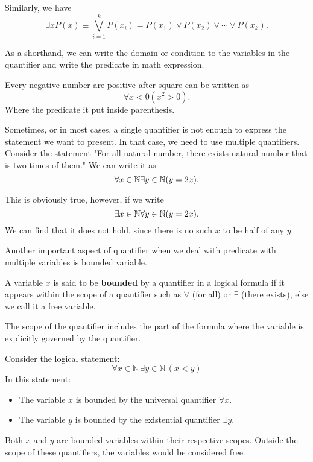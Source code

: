 Similarly, we have 
\[\exists x P(x) \equiv \bigvee_{i=1}^{k} P(x_i) = P(x_1)\lor P(x_2)\lor \cdots \lor P(x_k).\]


As a shorthand, we can write the domain or condition to the variables in the quantifier and write the predicate in math expression.
\begin{example}
    Every negative number are positive after square can be written as
    \[\forall x < 0 (x^2>0).\]
    Where the predicate it put inside parenthesis.
\end{example}

Sometimes, or in most cases, a single quantifier is not enough to express the statement we want to present. In that case, we need to use multiple quantifiers. Consider the statement "For all natural number, there exists natural number that is two times of them." We can write it as
\[\forall x\in \mathbb{N}\exists y \in \mathbb{N}(y=2x).\]

This is obviously true, however, if we write
\[\exists  x\in \mathbb{N}\forall y \in \mathbb{N}(y=2x).\]
We can find that it does not hold, since there is no such $x$ to be half of any $y$.

Another important aspect of quantifier when we deal with predicate with multiple variables is bounded variable.
\begin{definition}
    A variable \( x \) is said to be \textbf{bounded} by a quantifier in a logical formula if it appears within the scope of a quantifier such as \(\forall\) (for all) or \(\exists\) (there exists), else we call it a free variable. 

The scope of the quantifier includes the part of the formula where the variable is explicitly governed by the quantifier.
\end{definition}

\begin{example}
Consider the logical statement:
\[ \forall x \in \mathbb{N} \, \exists y \in \mathbb{N} \, (x < y) \]
In this statement:
\begin{itemize}
    \item The variable \( x \) is bounded by the universal quantifier \(\forall x\).
    \item The variable \( y \) is bounded by the existential quantifier \(\exists y\).
\end{itemize}
Both \( x \) and \( y \) are bounded variables within their respective scopes. Outside the scope of these quantifiers, the variables would be considered free.
\end{example}

